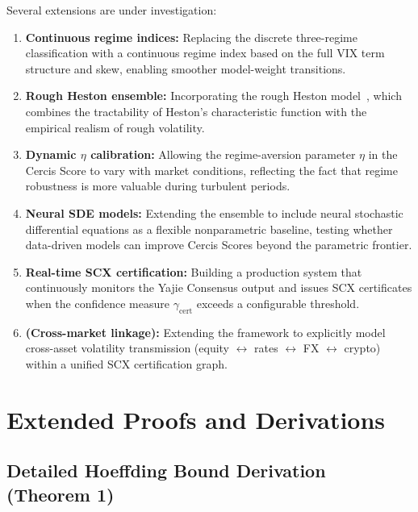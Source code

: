 \documentclass[11pt,a4paper]{article}
\theoremstyle{plain}
\theoremstyle{definition}
\theoremstyle{remark}
\newcommand{\SCX}{\textsc{SCX}}
\begin{document}
Several extensions are under investigation:

\begin{enumerate}[label=(\arabic*), leftmargin=*]
  \item \textbf{Continuous regime indices:} Replacing the discrete three-regime classification with a continuous regime index based on the full VIX term structure and skew, enabling smoother model-weight transitions.
  \item \textbf{Rough Heston ensemble:} Incorporating the rough Heston model~\citep{el2022rough}, which combines the tractability of Heston's characteristic function with the empirical realism of rough volatility.
  \item \textbf{Dynamic $\eta$ calibration:} Allowing the regime-aversion parameter $\eta$ in the Cercis Score to vary with market conditions, reflecting the fact that regime robustness is more valuable during turbulent periods.
  \item \textbf{Neural SDE models:} Extending the ensemble to include neural stochastic differential equations as a flexible nonparametric baseline, testing whether data-driven models can improve Cercis Scores beyond the parametric frontier.
  \item \textbf{Real-time SCX certification:} Building a production system that continuously monitors the Yajie Consensus output and issues \SCX{} certificates when the confidence measure $\gamma_{\text{cert}}$ exceeds a configurable threshold.
  \item \textbf{ (Cross-market linkage):} Extending the framework to explicitly model cross-asset volatility transmission (equity $\leftrightarrow$ rates $\leftrightarrow$ FX $\leftrightarrow$ crypto) within a unified SCX certification graph.
\end{enumerate}

\appendix

\section{Extended Proofs and Derivations}

\subsection{Detailed Hoeffding Bound Derivation (Theorem 1)}
\end{document}
